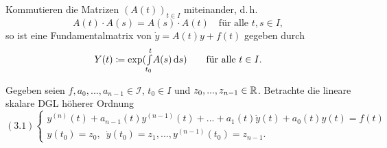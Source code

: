 \documentclass{cheat-sheet}
\begin{document}

\begin{satz}
  Kommutieren die Matrizen $(A(t))_{t \in I}$ miteinander, d.\,h.
  \[ A(t) \cdot A(s) = A(s) \cdot A(t) \quad \text{für alle $t, s \in I$}, \]
  so ist eine Fundamentalmatrix von $\dot{y} = A(t) y + f(t)$ gegeben durch
  \[
    Y(t) \coloneqq \exp({\textstyle \int\limits_{t_0}^{t}} A(s) \,\mathrm{d} s)
    \qquad \text{für alle $t \in I$.}
  \]
\end{satz}



\begin{prob}
  Gegeben seien $f, a_0, ..., a_{n-1} \in \mathcal{I}$, $t_0 \in I$ und $z_0, ..., z_{n-1} \in \mathbb{R}$. Betrachte die lineare skalare DGL höherer Ordnung
  \[
    (3.1) \left\{ \begin{array}{l}
      y^{(n)}(t) + a_{n-1}(t) y^{(n-1)}(t) + ... + a_1(t) \dot{y}(t) + a_0(t) y(t) = f(t)\\
      y(t_0) = z_0, \enspace \dot{y}(t_0) = z_1, ..., y^{(n-1)}(t_0) = z_{n-1}.
    \end{array} \right.
  \]
\end{prob}
\end{document}
